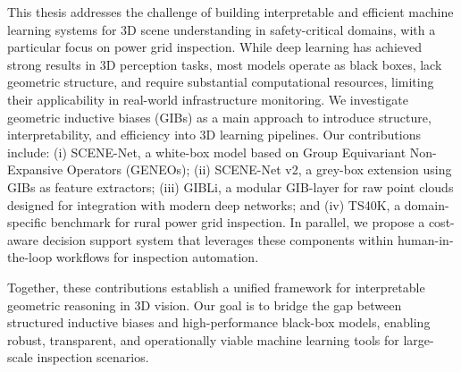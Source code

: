 
%



This thesis addresses the challenge of building interpretable and efficient
machine learning systems for 3D scene understanding in safety-critical domains,
with a particular focus on power grid inspection. While deep learning has
achieved strong results in 3D perception tasks, most models operate as black
boxes, lack geometric structure, and require substantial computational
resources, limiting their applicability in real-world infrastructure
monitoring.
%
We investigate geometric inductive biases (GIBs) as a main approach to
introduce structure, interpretability, and efficiency into 3D learning
pipelines. Our contributions include: (i) SCENE-Net, a white-box model based on
Group Equivariant Non-Expansive Operators (GENEOs); (ii) SCENE-Net v2, a
grey-box extension using GIBs as feature extractors; (iii) GIBLi, a modular
GIB-layer for raw point clouds designed for integration with modern deep
networks; and (iv) TS40K, a domain-specific benchmark for rural power grid
inspection. In parallel, we propose a cost-aware decision support system that
leverages these components within human-in-the-loop workflows for inspection
automation.

Together, these contributions establish a unified framework for interpretable
geometric reasoning in 3D vision. Our goal is to bridge the gap between
structured inductive biases and high-performance black-box models, enabling
robust, transparent, and operationally viable machine learning tools for
large-scale inspection scenarios.


